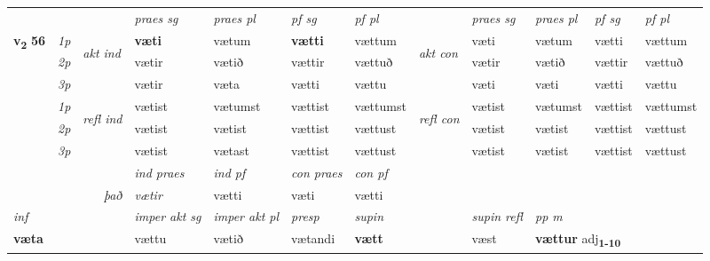 \begin{longtable}[l]{X>{\footnotesize\itshape}llXXXXlXXXX}
\midrule

 & &   & \textit{praes sg}  & \textit{praes pl}    & \textit{ pf sg} & \textit{pf pl} & & \textit{praes sg}  & \textit{praes pl}    & \textit{pf sg} & \textit{pf pl }  \\ \cmidrule{4-7} \cmidrule{9-12}
 \multirow{2}{*}{{{\textbf{v{\textsubscript{2}}} \Large{\textbf{56}}}}}  & 1p & \multirow{3}{*}{\begin{turn}{90}\textit{akt ind}\end{turn}} & \textbf{væti} & vætum & \textbf{vætti} & vættum & \multirow{3}{*}{\begin{turn}{90}\textit{akt con}\end{turn}} &væti & vætum & vætti & vættum\\*
 & 2p &  &  vætir  & vætið & vættir & vættuð & & vætir & vætið & vættir & vættuð \\*
 & 3p &  & vætir & væta & vætti & vættu & & væti & væti& vætti & vættu \\*
\cmidrule{4-7} \cmidrule{9-12}
 & 1p & \multirow{3}{*}{\begin{turn}{90}\textit{refl ind}\end{turn}}  & vætist & vætumst & vættist & vættumst & \multirow{3}{*}{\begin{turn}{90}\textit{refl con}\end{turn}}  &vætist & vætumst & vættist & vættumst \\*
 & 2p &  & vætist & vætist & vættist & vættust & &vætist & vætist & vættist & vættust \\*
 & 3p  & & vætist & vætast & vættist & vættust & & vætist & vætist& vættist & vættust \\*
\cmidrule{4-7} \cmidrule{9-12}

   && &  \textit{ind praes} & \textit{ind pf} & \textit{con praes} & \textit{con pf} \\*
\multicolumn{3}{r}{\textit{það}} & vætir & vætti & væti & vætti \\*

\cmidrule{4-7}
   {\textit{inf}} & &  & \textit{imper akt sg} & \textit{imper akt pl}   & \textit{presp} & \textit{supin} && \textit{supin refl} & \textit{pp m} \\*
  {\textbf{væta}} & && vættu  & vætið   & vætandi &  \textbf{vætt} && væst & \multicolumn{2}{l}{\textbf{vættur} adj\textbf{\textsubscript{1-10}}} \\*

\midrule


\end{longtable}
